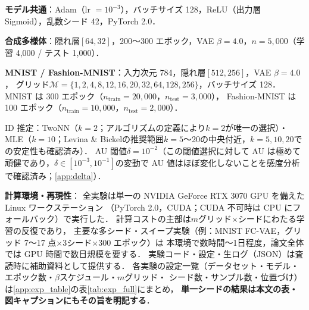\documentclass[11pt,a4paper]{jsarticle}
\begin{document}
\textbf{モデル共通}：Adam（lr $= 10^{-3}$），バッチサイズ 128，ReLU（出力層 Sigmoid），乱数シード 42，PyTorch 2.0．

\textbf{合成多様体}：隠れ層$[64, 32]$，200〜300 エポック，VAE $\beta = 4.0$，$n = 5{,}000$（学習 4,000 / テスト 1,000）．

\textbf{MNIST / Fashion-MNIST}：入力次元 784，隠れ層$[512, 256]$，VAE $\beta = 4.0$，
グリッド$\mathcal{M} = \{1,2,4,8,12,16,20,32,64,128,256\}$，バッチサイズ 128．
MNIST は 300 エポック（$n_{\mathrm{train}} = 20{,}000$，$n_{\mathrm{test}} = 3{,}000$），
Fashion-MNIST は 100 エポック（$n_{\mathrm{train}} = 10{,}000$，$n_{\mathrm{test}} = 2{,}000$）．

ID 推定：TwoNN（$k=2$；アルゴリズムの定義により$k=2$が唯一の選択）・MLE（$k=10$；Levina \& Bickel\cite{levina2005mle}の推奨範囲$k=5$〜20の中央付近，$k=5,10,20$での安定性も確認済み）\cite{facco2017twonn,levina2005mle}．
AU 閾値$\delta = 10^{-2}$\cite{lucas2019elbo}（この閾値選択に対して AU は極めて頑健であり，$\delta \in [10^{-3}, 10^{-1}]$の変動で AU 値はほぼ変化しないことを感度分析で確認済み；\ref{app:delta}）．

\textbf{計算環境・再現性}：
全実験は単一の NVIDIA GeForce RTX 3070 GPU を備えた Linux ワークステーション
（PyTorch 2.0，CUDA；CUDA 不可時は CPU にフォールバック）で実行した．
計算コストの主部は$m$グリッド$\times$シードにわたる学習の反復であり，
主要な多シード・スイープ実験（例：MNIST FC-VAE，グリッド 7〜17 点$\times$3シード$\times$300 エポック）は
本環境で数時間〜1日程度，論文全体では GPU 時間で数日規模を要する．
実験コード・設定・生ログ（JSON）は査読時に補助資料として提供する．
各実験の設定一覧（データセット・モデル・エポック数・$\beta$スケジュール・$m$グリッド・
シード数・サンプル数・位置づけ）は\ref{app:exp_table}の表\ref{tab:exp_full}にまとめ，
\textbf{単一シードの結果は本文の表・図キャプションにもその旨を明記する}．
\end{document}

